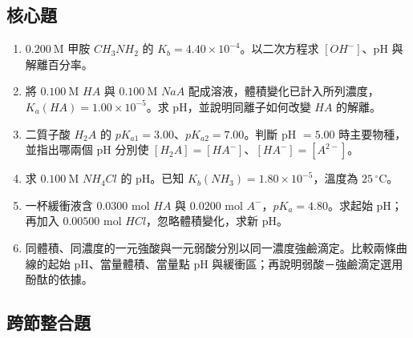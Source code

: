 \documentclass[11pt,a4paper]{article}
\begin{document}
\subsection{核心題}\label{ux6838ux5fc3ux984c}

\begin{enumerate}
\def\labelenumi{\arabic{enumi}.}
\setcounter{enumi}{6}
\item
  \(0.200\ \mathrm M\) 甲胺 \(CH_3NH_2\) 的 \(K_b=4.40\times10^{-4}\)。以二次方程求 \([OH^-]\)、pH 與解離百分率。
\item
  將 \(0.100\ \mathrm M\) \(HA\) 與 \(0.100\ \mathrm M\) \(NaA\) 配成溶液，體積變化已計入所列濃度，\(K_a(HA)=1.00\times10^{-5}\)。求 pH，並說明同離子如何改變 \(HA\) 的解離。
\item
  二質子酸 \(H_2A\) 的 \(pK_{a1}=3.00\)、\(pK_{a2}=7.00\)。判斷 pH \(=5.00\) 時主要物種，並指出哪兩個 pH 分別使 \([H_2A]=[HA^-]\)、\([HA^-]=[A^{2-}]\)。
\item
  求 \(0.100\ \mathrm M\) \(NH_4Cl\) 的 pH。已知 \(K_b(NH_3)=1.80\times10^{-5}\)，溫度為 \(25\,^\circ\mathrm C\)。
\item
  一杯緩衝液含 \(0.0300\) mol \(HA\) 與 \(0.0200\) mol \(A^-\)，\(pK_a=4.80\)。求起始 pH；再加入 \(0.00500\) mol \(HCl\)，忽略體積變化，求新 pH。
\item
  同體積、同濃度的一元強酸與一元弱酸分別以同一濃度強鹼滴定。比較兩條曲線的起始 pH、當量體積、當量點 pH 與緩衝區；再說明弱酸－強鹼滴定選用酚酞的依據。
\end{enumerate}

\subsection{跨節整合題}\label{ux8de8ux7bc0ux6574ux5408ux984c}
\end{document}
